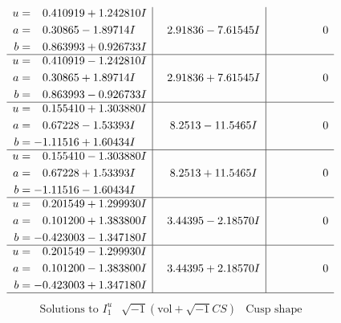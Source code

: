 \documentclass[1p]{elsarticle_modified}
\theoremstyle{definition}
\newcommand{\I}{\sqrt{-1}}
\begin{document}
$$\begin{array}{c|c|c}
\begin{aligned}
u &= \phantom{-}0.410919 + 1.242810 I \\
a &= \phantom{-}0.30865 - 1.89714 I \\
b &= \phantom{-}0.863993 + 0.926733 I\end{aligned}
 & \phantom{-}2.91836 - 7.61545 I & \phantom{-0.000000 } 0 \\ \hline\begin{aligned}
u &= \phantom{-}0.410919 - 1.242810 I \\
a &= \phantom{-}0.30865 + 1.89714 I \\
b &= \phantom{-}0.863993 - 0.926733 I\end{aligned}
 & \phantom{-}2.91836 + 7.61545 I & \phantom{-0.000000 } 0 \\ \hline\begin{aligned}
u &= \phantom{-}0.155410 + 1.303880 I \\
a &= \phantom{-}0.67228 - 1.53393 I \\
b &= -1.11516 + 1.60434 I\end{aligned}
 & \phantom{-}8.2513 - 11.5465 I & \phantom{-0.000000 } 0 \\ \hline\begin{aligned}
u &= \phantom{-}0.155410 - 1.303880 I \\
a &= \phantom{-}0.67228 + 1.53393 I \\
b &= -1.11516 - 1.60434 I\end{aligned}
 & \phantom{-}8.2513 + 11.5465 I & \phantom{-0.000000 } 0 \\ \hline\begin{aligned}
u &= \phantom{-}0.201549 + 1.299930 I \\
a &= \phantom{-}0.101200 + 1.383800 I \\
b &= -0.423003 - 1.347180 I\end{aligned}
 & \phantom{-}3.44395 - 2.18570 I & \phantom{-0.000000 } 0 \\ \hline\begin{aligned}
u &= \phantom{-}0.201549 - 1.299930 I \\
a &= \phantom{-}0.101200 - 1.383800 I \\
b &= -0.423003 + 1.347180 I\end{aligned}
 & \phantom{-}3.44395 + 2.18570 I & \phantom{-0.000000 } 0\\
 \hline 
 \end{array}$$\newpage$$\begin{array}{c|c|c}  
\text{Solutions to }I^u_{1}& \I (\text{vol} + \sqrt{-1}CS) & \text{Cusp shape}\\

\end{array}$$
\end{document}

